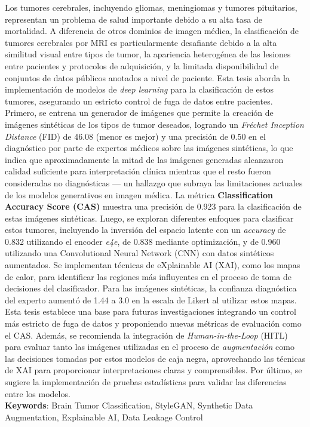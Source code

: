 \documentclass[
	spanish, %
	letterpaper, oneside
]{book}
\def\documenttitle {Explainable Brain Tumor Classification via Generation Using Conditional StyleGANs and CNNs}
\begin{document}
\renewcommand{\documenttitle}{Clasificación Explicable de Tumores Cerebrales mediante Generación con StyleGAN Condicional y Redes Neuronales Convolucionales}
\begin{abstractd}
Los tumores cerebrales, incluyendo gliomas, meningiomas y tumores pituitarios, representan un problema de salud importante debido a su alta tasa de mortalidad. A diferencia de otros dominios de imagen médica, la clasificación de tumores cerebrales por MRI es particularmente desafiante debido a la alta similitud visual entre tipos de tumor, la apariencia heterogénea de las lesiones entre pacientes y protocolos de adquisición, y la limitada disponibilidad de conjuntos de datos públicos anotados a nivel de paciente. Esta tesis aborda la implementación de modelos de \textit{deep learning} para la clasificación de estos tumores, asegurando un estricto control de fuga de datos entre pacientes. Primero, se entrena un generador de imágenes que permite la creación de imágenes sintéticas de los tipos de tumor deseados, logrando un \textit{Fr\'echet Inception Distance} (FID) de 46.08 (menor es mejor) y una precisión de 0.50 en el diagnóstico por parte de expertos médicos sobre las imágenes sintéticas, lo que indica que aproximadamente la mitad de las imágenes generadas alcanzaron calidad suficiente para interpretación clínica mientras que el resto fueron consideradas no diagnósticas --- un hallazgo que subraya las limitaciones actuales de los modelos generativos en imagen médica. La métrica \textbf{Classification Accuracy Score (CAS)} muestra una precisión de 0.923 para la clasificación de estas imágenes sintéticas. Luego, se exploran diferentes enfoques para clasificar estos tumores, incluyendo la inversión del espacio latente con un \textit{accuracy} de 0.832 utilizando el encoder \textit{e4e}, de 0.838 mediante optimización, y de 0.960 utilizando una Convolutional Neural Network (CNN) con datos sintéticos aumentados. Se implementan técnicas de eXplainable AI (XAI), como los mapas de calor, para identificar las regiones más influyentes en el proceso de toma de decisiones del clasificador. Para las imágenes sintéticas, la confianza diagnóstica del experto aumentó de 1.44 a 3.0 en la escala de Likert al utilizar estos mapas. Esta tesis establece una base para futuras investigaciones integrando un control más estricto de fuga de datos y proponiendo nuevas métricas de evaluación como el CAS. Además, se recomienda la integración de \textit{Human-in-the-Loop} (HITL) para evaluar tanto las imágenes utilizadas en el proceso de \textit{augmentación} como las decisiones tomadas por estos modelos de caja negra, aprovechando las técnicas de XAI para proporcionar interpretaciones claras y comprensibles. Por último, se sugiere la implementación de pruebas estadísticas para validar las diferencias entre los modelos.\\

\textbf{Keywords}: Brain Tumor Classification, StyleGAN, Synthetic Data Augmentation, Explainable AI, Data Leakage Control


\end{abstractd}
\renewcommand{\documenttitle}{Explainable Brain Tumor Classification via Generation Using Conditional StyleGANs and CNNs}
\end{document}
